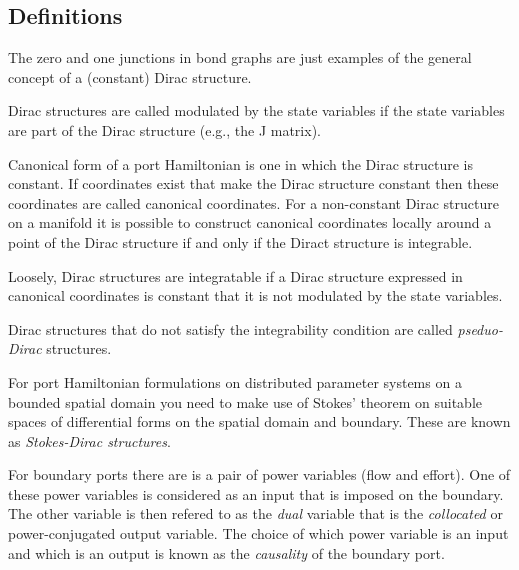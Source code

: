  
\clearemptydoublepage

\subsection{Definitions}

The zero and one junctions in bond graphs are just examples of the
general concept of a (constant) Dirac structure.

Dirac structures are called modulated by the state variables if the
state variables are part of the Dirac structure (e.g., the J matrix).

Canonical form of a port Hamiltonian is one in which the Dirac
structure is constant. If coordinates exist that make the Dirac
structure constant then these coordinates are called canonical
coordinates. For a non-constant Dirac structure on a manifold it is
possible to construct canonical coordinates locally around a point of
the Dirac structure if and only if the Diract structure is integrable.

Loosely, Dirac structures are integratable if a Dirac structure
expressed in canonical coordinates is constant \ie that it is not
modulated by the state variables.

Dirac structures that do not satisfy the integrability condition are
called \emph{pseduo-Dirac} structures.

For port Hamiltonian formulations on distributed parameter systems on
a bounded spatial domain you need to make use of Stokes' theorem on
suitable spaces of differential forms on the spatial domain and
boundary. These are known as \emph{Stokes-Dirac structures}.

For boundary ports there are is a pair of power variables (flow and
effort). One of these power variables is considered as an input that
is imposed on the boundary. The other variable is then refered to as
the \emph{dual} variable that is the \emph{collocated} or
{power-conjugated} output variable. The choice of which power variable
is an input and which is an output is known as the \emph{causality} of
the boundary port.




